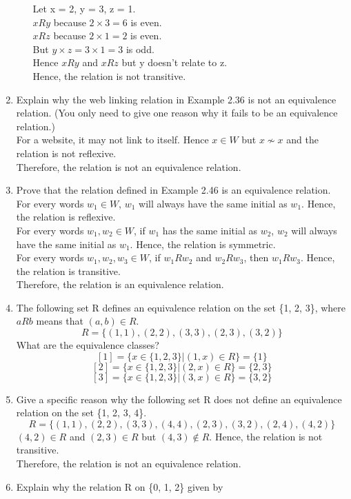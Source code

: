 \documentclass[12pt]{article}
\begin{document}
\begin{enumerate}
\begin{enumerate}
    Let x = 2, y = 3, z = 1.\\
    $xRy$ because $2 \times 3 = 6$ is even.\\
    $xRz$ because $2 \times 1 = 2$ is even.\\
    But $y \times z = 3 \times 1 = 3$ is odd.\\
    Hence $xRy$ and $xRz$ but y doesn't relate to z.\\
    Hence, the relation is not transitive.
  \end{enumerate}
  \item Explain why the web linking relation in Example 2.36 is not an equivalence relation. (You only need to give one reason why it fails to be an equivalence relation.)\\
  For a website, it may not link to itself. Hence $x \in W$ but $x \not\sim x$ and the relation is not reflexive. \\
  Therefore, the relation is not an equivalence relation.
  \item Prove that the relation defined in Example 2.46 is an equivalence relation.\\
  For every words $w_1 \in W$, $w_1$ will always have the same initial as $w_1$. Hence, the relation is reflexive.\\
  For every words $w_1, w_2 \in W$, if $w_1$ has the same initial as $w_2$, $w_2$ will always have the same initial as $w_1$. Hence, the relation is symmetric.\\
  For every words $w_1, w_2, w_3 \in W$, if $w_1 R w_2$ and $w_2 R w_3$, then $w_1 R w_3$. Hence, the relation is transitive.\\
  Therefore, the relation is an equivalence relation.
  \item The following set R defines an equivalence relation on the set \{1, 2, 3\}, where $a R b$ means that $(a, b) \in R$.
  \[R = \{(1,1),(2,2),(3,3),(2,3),(3,2)\}\]
  What are the equivalence classes?
  \[[1] = \{x \in \{1,2,3\}| (1,x) \in R\} = \{1\}\]
  \[[2] = \{x \in \{1,2,3\}| (2,x) \in R\} = \{2,3\}\]
  \[[3] = \{x \in \{1,2,3\}| (3,x) \in R\} = \{3,2\}\]
  \item Give a specific reason why the following set R does not define an equivalence relation on the set \{1, 2, 3, 4\}.
  \[R = \{(1,1),(2,2),(3,3),(4,4),(2,3),(3,2),(2,4),(4,2)\}\]
  $(4,2) \in R$ and $(2,3) \in R$ but $(4,3) \not\in R$. Hence, the relation is not transitive.\\
  Therefore, the relation is not an equivalence relation.
  \item Explain why the relation R on \{0, 1, 2\} given by 

\end{enumerate}
\end{document}
